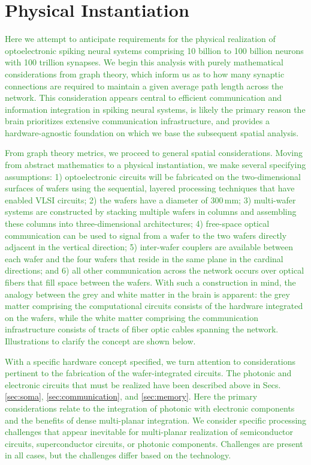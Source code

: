 \documentclass[twocolumn]{article}
\begin{document}
\section{\label{sec:instantiation}Physical Instantiation}
\textcolor{ForestGreen}{Here we attempt to anticipate requirements for the physical realization of optoelectronic spiking neural systems comprising 10 billion to 100 billion neurons with 100 trillion synapses. We begin this analysis with purely mathematical considerations from graph theory, which inform us as to how many synaptic connections are required to maintain a given average path length across the network. This consideration appears central to efficient communication and information integration in spiking neural systems, is likely the primary reason the brain prioritizes extensive communication infrastructure, and provides a hardware-agnostic foundation on which we base the subsequent spatial analysis.}

\textcolor{ForestGreen}{From graph theory metrics, we proceed to general spatial considerations. Moving from abstract mathematics to a physical instantiation, we make several specifying assumptions: 1) optoelectronic circuits will be fabricated on the two-dimensional surfaces of wafers using the sequential, layered processing techniques that have enabled VLSI circuits; 2) the wafers have a diameter of 300\,mm; 3) multi-wafer systems are constructed by stacking multiple wafers in columns and assembling these columns into three-dimensional architectures; 4) free-space optical communication can be used to signal from a wafer to the two wafers directly adjacent in the vertical direction; 5) inter-wafer couplers are available between each wafer and the four wafers that reside in the same plane in the cardinal directions; and 6) all other communication across the network occurs over optical fibers that fill space between the wafers. With such a construction in mind, the analogy between the grey and white matter in the brain is apparent: the grey matter comprising the computational circuits consists of the hardware integrated on the wafers, while the white matter comprising the communication infrastructure consists of tracts of fiber optic cables spanning the network. Illustrations to clarify the concept are shown below.}

\textcolor{ForestGreen}{With a specific hardware concept specified, we turn attention to considerations pertinent to the fabrication of the wafer-integrated circuits. The photonic and electronic circuits that must be realized have been described above in Secs. \ref{sec:soma}, \ref{sec:communication}, and \ref{sec:memory}. Here the primary considerations relate to the integration of photonic with electronic components and the benefits of dense multi-planar integration. We consider specific processing challenges that appear inevitable for multi-planar realization of semiconductor circuits, superconductor circuits, or photonic components. Challenges are present in all cases, but the challenges differ based on the technology.}
\end{document}

